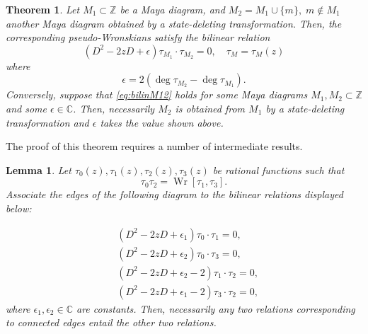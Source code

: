 \documentclass{amsart}
\newtheorem{theorem}{Theorem}
\newtheorem{lemma}{Lemma}
\theoremstyle{definition}
\newcommand{\Wr}{\operatorname{Wr}}
\newcommand{\Z}{\mathbb{Z}}
\newcommand{\C}{\mathbb{C}}
\begin{document}
\begin{theorem}
  \label{thm:Mbilin}
  Let $M_1\subset \Z$ be a Maya diagram, and
  $M_2 = M_1 \cup \{ m\},\; m\notin M_1$ another Maya diagram obtained
  by a state-deleting transformation.  Then, the corresponding
  pseudo-Wronskians satisfy the bilinear relation
  \begin{equation}
    \label{eq:bilinM12}
    (D^2-2zD + \epsilon) \tau_{M_1} \cdot \tau_{M_2} = 0,\quad \tau_M=\tau_M(z)
   \end{equation}
   where
   \begin{equation}
     \label{eq:epsilonM12}
     \epsilon = 2 (\deg \tau_{M_2} - \deg \tau_{M_1}).
   \end{equation}
   Conversely, suppose that \eqref{eq:bilinM12} holds for some Maya
   diagrams $M_1, M_2\subset \Z$ and some $\epsilon\in \C$.  Then,
   necessarily $M_2$ is obtained from $M_1$ by a state-deleting
   transformation and $\epsilon$ takes the value shown above.
\end{theorem}
\noindent The proof of this theorem requires a number of intermediate
results.
\begin{lemma}
  \label{lem:tau0123}
  Let $\tau_0(z),\tau_1(z), \tau_2(z), \tau_3(z)$ be rational
  functions such that
  \begin{equation}
    \label{eq:tau3def}
    \tau_0 \tau_2 = \Wr[\tau_1,\tau_3].
  \end{equation}
  Associate the edges of the following diagram to the bilinear
  relations displayed below:
  \begin{center}
  \end{center}
  \begin{align}
    \label{eq:tau01}
    &(D^2-2zD+\epsilon_1) \tau_0 \cdot \tau_1 = 0,\\
    \label{eq:tau03}
    &(D^2-2zD+\epsilon_2) \tau_0 \cdot \tau_3 = 0,\\
    \label{eq:tau12}
    &(D^2-2zD+\epsilon_2-2) \tau_1 \cdot \tau_2 = 0, \\
    \label{eq:tau32}
    &(D^2-2zD+\epsilon_1-2) \tau_3 \cdot \tau_2 = 0,
  \end{align}
  where $\epsilon_1,\epsilon_2\in \C$ are constants.
  Then, necessarily any two relations corresponding to connected edges
  entail the other two relations.
\end{lemma}
\end{document}

